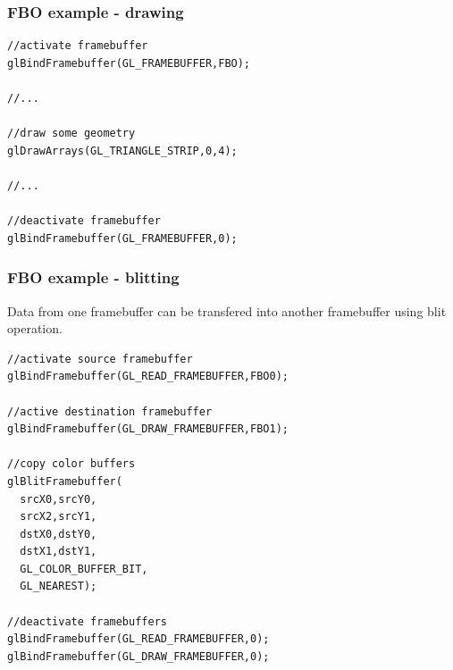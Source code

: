 \begin{frame}[fragile]
\frametitle{FBO example - drawing}
  {\scriptsize
  \begin{verbatim}
//activate framebuffer
glBindFramebuffer(GL_FRAMEBUFFER,FBO);

//...

//draw some geometry
glDrawArrays(GL_TRIANGLE_STRIP,0,4);

//...

//deactivate framebuffer
glBindFramebuffer(GL_FRAMEBUFFER,0);
  \end{verbatim}
  }
\end{frame}

\begin{frame}[fragile]
\frametitle{FBO example - blitting}
  Data from one framebuffer can be transfered into another framebuffer using blit operation.
  {\scriptsize
  \begin{verbatim}
//activate source framebuffer
glBindFramebuffer(GL_READ_FRAMEBUFFER,FBO0);

//active destination framebuffer
glBindFramebuffer(GL_DRAW_FRAMEBUFFER,FBO1);

//copy color buffers
glBlitFramebuffer(
  srcX0,srcY0,
  srcX2,srcY1,
  dstX0,dstY0,
  dstX1,dstY1,
  GL_COLOR_BUFFER_BIT,
  GL_NEAREST);

//deactivate framebuffers
glBindFramebuffer(GL_READ_FRAMEBUFFER,0);
glBindFramebuffer(GL_DRAW_FRAMEBUFFER,0);
  \end{verbatim}
  }
\end{frame}


